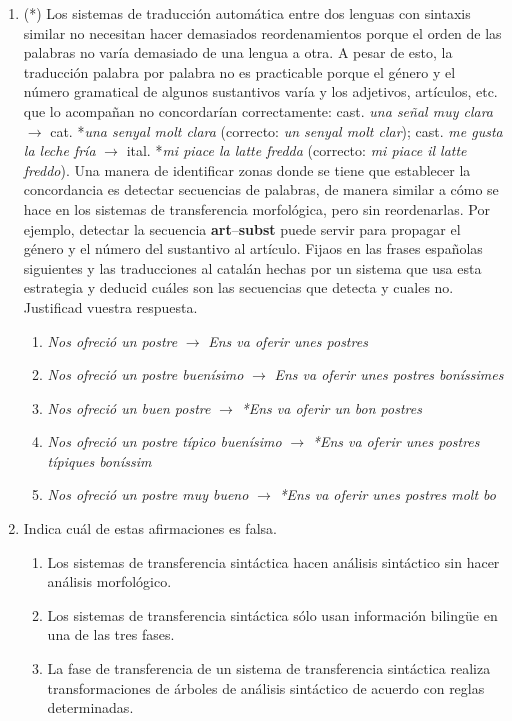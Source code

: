 \begin{enumerate}
\item (*) \label{ex:postres} Los sistemas de traducción automática entre dos lenguas con sintaxis similar no necesitan hacer demasiados reordenamientos porque el orden de las palabras no varía demasiado de una lengua a otra. A pesar de esto, la traducción palabra por palabra no es practicable porque el género y el número gramatical de algunos sustantivos varía y los adjetivos, artículos, etc. que lo acompañan no concordarían correctamente: cast. {\em una señal muy clara\/} $\rightarrow$ cat. *{\em una senyal molt clara} (correcto: {\em un senyal molt clar\/}); cast. {\em me gusta la leche fría} $\rightarrow$ ital. *{\em mi piace la latte fredda\/} (correcto: {\em mi piace il latte freddo}). Una manera de identificar zonas donde se tiene que establecer la concordancia es detectar secuencias de palabras, de manera similar a cómo se hace en los sistemas de transferencia morfológica, pero sin reordenarlas. Por ejemplo, detectar la secuencia {\bf art}--{\bf subst} puede servir para propagar el género y el número del sustantivo al artículo. Fijaos en las frases españolas siguientes y las traducciones al catalán hechas por un sistema que usa esta estrategia y deducid cuáles son las secuencias que detecta y cuales no. Justificad vuestra respuesta. \begin{enumerate} \item \emph{Nos ofreció un postre} $\rightarrow$ \emph{Ens va oferir unes postres\/} \item \emph{Nos ofreció un postre buenísimo} $\rightarrow$ \emph{Ens va oferir unes postres boníssimes\/} \item \emph{Nos ofreció un buen postre} $\rightarrow$ \emph{*Ens va oferir un bon postres\/} \item \emph{Nos ofreció un postre típico buenísimo\/} $\rightarrow$ \emph{*Ens va oferir unes postres típiques boníssim\/} \item \emph{Nos ofreció un postre muy bueno} $\rightarrow$ \emph{*Ens va oferir unes postres molt bo\/} \end{enumerate} 

\item Indica cuál de estas afirmaciones es falsa. \begin{enumerate} \item Los sistemas de transferencia sintáctica hacen análisis sintáctico sin hacer análisis morfológico. \item Los sistemas de transferencia sintáctica sólo usan información bilingüe en una de las tres fases. \item La fase de transferencia de un sistema de transferencia sintáctica realiza transformaciones de árboles de análisis sintáctico de acuerdo con reglas determinadas. \end{enumerate} 


\end{enumerate}
